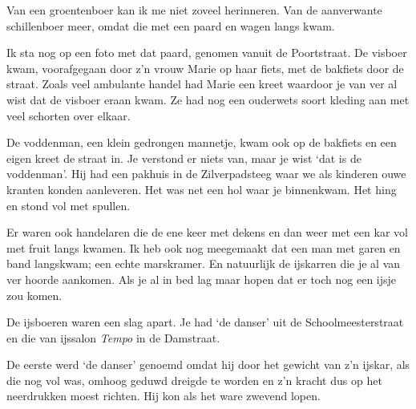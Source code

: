 \documentclass[12pt,twoside]{memoir}
\begin{document}
Van een groentenboer kan ik me niet zoveel herinneren. Van de aanverwante schillenboer meer, omdat die met een paard en wagen langs kwam. 

Ik sta nog op een foto met dat paard, genomen vanuit de Poortstraat. De visboer kwam, voorafgegaan door z’n vrouw Marie op haar fiets, met de bakfiets door de straat. Zoals veel ambulante handel had Marie een kreet waardoor je van ver al wist dat de visboer eraan kwam. Ze had nog een ouderwets soort kleding aan met veel schorten over elkaar.

De voddenman, een klein gedrongen mannetje, kwam ook op de bakfiets en een eigen kreet de straat in. Je verstond er niets van, maar je wist `dat is de voddenman’. Hij had een pakhuis in de Zilverpadsteeg waar we als kinderen ouwe kranten konden aanleveren. Het was net een hol waar je binnenkwam. Het hing en stond vol met spullen. 

Er waren ook handelaren die de ene keer met dekens en dan weer met een kar vol met fruit langs kwamen. Ik heb ook nog meegemaakt dat een man met garen en band langskwam; een echte marskramer. En natuurlijk de ijskarren die je al van ver hoorde aankomen. Als je al in bed lag maar hopen dat er toch nog een ijsje zou komen.

De ijsboeren waren een slag apart. Je had `de danser’ uit de Schoolmeesterstraat en die van ijssalon \emph{Tempo} in de Damstraat. 

De eerste werd `de danser' genoemd omdat hij door het gewicht van z’n ijskar, als die nog vol was, omhoog geduwd dreigde te worden en z’n kracht dus op het neerdrukken moest richten. Hij kon als het ware zwevend lopen. 
\end{document}
